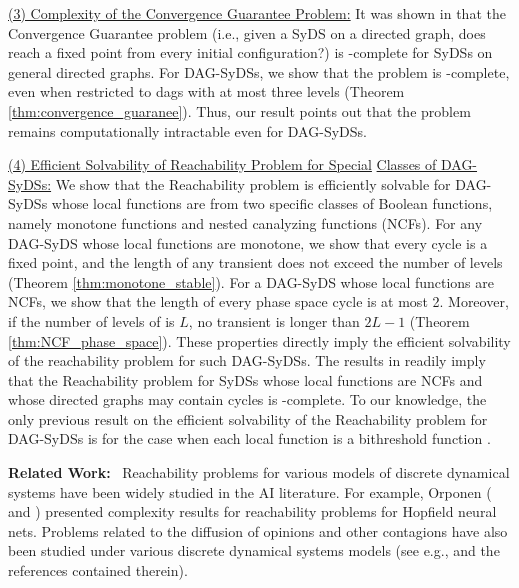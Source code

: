 \smallskip

\noindent
\underline{(3) Complexity of the Convergence Guarantee Problem:}
It was shown in \cite{Chistikov-etal-2020} that
the Convergence Guarantee problem 
(i.e., given a SyDS \cals{} on
a directed graph, does \cals{} reach a fixed point from every
initial configuration?)  
is \cpsp-complete for SyDSs on general directed graphs.
For DAG-SyDSs, we show that the problem is \cconp-complete,
even when restricted to dags with at most  three levels 
(Theorem \ref{thm:convergence_guaranee}).
Thus, our result points out that the problem remains 
computationally intractable even for DAG-SyDSs.

\smallskip

\noindent
\underline{(4) Efficient Solvability of Reachability Problem for Special}\newline
\underline{Classes of DAG-SyDSs:} 
We show that the Reachability problem is efficiently solvable for
DAG-SyDSs whose local functions are from two specific
classes of Boolean functions, namely monotone functions and
nested canalyzing functions (NCFs).
For any DAG-SyDS whose local functions are monotone,
we show that every cycle is a fixed point, 
and the length of any transient does not exceed the number of levels
(Theorem \ref{thm:monotone_stable}).
For a DAG-SyDS \cals{} whose local functions are NCFs, we show
that the length of every phase space cycle is at most 2.
Moreover, if the number of levels of  \cals{} is $L$,
no transient is longer than $2L-1$
(Theorem \ref{thm:NCF_phase_space}).
These properties
directly imply the efficient solvability of the reachability
problem for such DAG-SyDSs.
The results in \cite{Rosenkrantz-etal-2018} readily imply
that the Reachability problem for SyDSs whose local
functions are NCFs and whose directed graphs may contain cycles  
is \cpsp-complete.
To our knowledge, the only previous result on the efficient
solvability of the  Reachability problem for DAG-SyDSs is
for the case when each local function is a bithreshold
function \cite{KKM+2013}.


\smallskip

\noindent
\textbf{Related Work:}~ Reachability problems for various
models of discrete dynamical systems have been widely studied
in the AI literature.
For example, Orponen 
(\citeyear{Orponen-1993} and \citeyear{Orponen-1994}) presented
complexity results for  reachability problems for Hopfield neural nets.
Problems related to the diffusion of opinions and other contagions have
also been studied under various discrete dynamical systems
models (see e.g., \cite{Auletta-etal-2018,Botan-etal-2019,Chistikov-etal-2020}
and the references contained therein).

